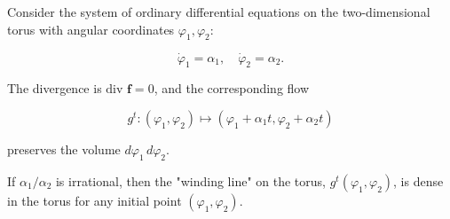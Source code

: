Consider the system of ordinary differential equations on the two-dimensional torus with angular coordinates $\varphi_1, \varphi_2$:

$$\dot{\varphi}_1 = \alpha_1, \quad \dot{\varphi}_2 = \alpha_2.$$

The divergence is $\text{div } \mathbf{f} = 0$, and the corresponding flow

$$g^t: (\varphi_1, \varphi_2) \mapsto (\varphi_1 + \alpha_1 t, \varphi_2 + \alpha_2 t)$$

preserves the volume $d\varphi_1 \, d\varphi_2$.

If $\alpha_1/\alpha_2$ is irrational, then the "winding line" on the torus, $g^t(\varphi_1, \varphi_2)$, is dense in the torus for any initial point $(\varphi_1, \varphi_2)$.
